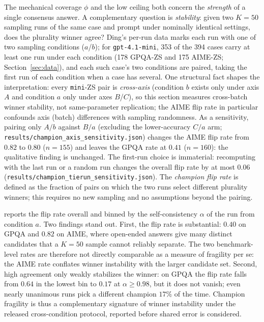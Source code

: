 \documentclass[a4paper,fleqn]{cas-sc}
\begin{document}
The mechanical coverage $\phi$ and the low ceiling both concern the
\emph{strength} of
a single consensus answer. A complementary question is \emph{stability}:
given two $K=50$ sampling runs of the same case and prompt under nominally identical settings,
does the plurality winner agree? Ding's per-run data marks each run with
one of two sampling conditions ($a$/$b$); for \texttt{gpt-4.1-mini}, 353
of the 394 cases carry at least one run under each condition (178 GPQA-ZS
and 175 AIME-ZS; Section~\ref{sec:data}), and each such case's two conditions are paired,
taking the first run of each condition when a case has several. One structural fact shapes the interpretation: every \texttt{mini}-ZS pair is \emph{cross-axis} (condition $b$ exists only under axis $A$ and condition $a$ only under axes $B$/$C$), so this section measures cross-batch winner stability, not same-parameter replication; the AIME flip rate in particular confounds axis (batch) differences with sampling randomness. As a sensitivity, pairing only $A/b$ against $B/a$ (excluding the lower-accuracy $C/a$ arm; \texttt{results/champion\_axis\_sensitivity.json}) changes the AIME flip rate from $0.82$ to $0.80$ ($n=155$) and leaves the GPQA rate at $0.41$ ($n=160$): the qualitative finding is unchanged. The first-run choice is immaterial: recomputing with the last
run or a random run changes the overall flip rate by at most $0.06$ (\texttt{results/champion\_tierun\_sensitivity.json}).
The \emph{champion flip rate} is defined as the
fraction of pairs on which the two runs select different plurality
winners; this requires no new sampling and no assumptions beyond
the pairing.

 reports the flip rate overall and binned by the
self-consistency $\alpha$ of the run from condition $a$. Two findings stand out. First,
the flip rate is substantial: $0.40$ on GPQA and $0.82$ on AIME, where
open-ended answers give many distinct candidates that a $K=50$ sample
cannot reliably separate. The two benchmark-level rates are therefore
not directly comparable as a measure of fragility per se: the AIME rate
conflates winner instability with the larger candidate set. Second, high agreement only weakly stabilizes
the winner: on GPQA the flip rate falls from $0.64$ in the lowest bin to
$0.17$ at $\alpha\geq0.98$, but it does not vanish; even nearly unanimous
runs pick a different champion $17\%$ of the time. Champion fragility is
thus a complementary signature of winner instability under the
released cross-condition protocol, reported before shared error is
considered.
\end{document}
